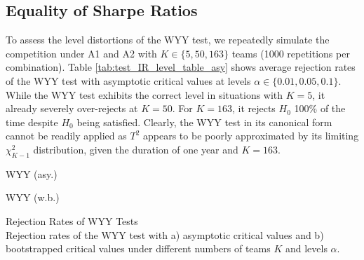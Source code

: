 \documentclass[3p,times,twocolumn]{elsarticle}
\begin{document}
\subsection{Equality of Sharpe Ratios}\label{subsection:equality_IR}

To assess the level distortions of the WYY test, we repeatedly simulate the competition under A1 and A2 with $K \in \{5,50,163\}$ teams (1000 repetitions per combination).
Table \ref{tab:test_IR_level_table_asy} shows average rejection rates of the WYY test with asymptotic critical values at levels $\alpha \in \{0.01,0.05,0.1\}$.
While the WYY test exhibits the correct level in situations with $K=5$, it already severely over-rejects at $K=50$.
For $K=163$, it rejects $H_{0}$ 100\% of the time despite $H_{0}$ being satisfied. 
Clearly, the WYY test in its canonical form cannot be readily applied as $T^{2}$ appears to be poorly approximated by its limiting $\chi^{2}_{K-1}$ distribution, given the duration of one year and $K=163$.

\begin{table}[!htbp]
    \centering
    \label{tab:combined_rejection_rates}
    \fontsize{5}{5}\selectfont 
    \begin{subtable}{.5\linewidth} 
        \centering
        \caption{WYY (asy.)}
        \label{tab:test_IR_level_table_asy}
    \end{subtable}%
    \begin{subtable}{.5\linewidth}
        \centering
        \caption{WYY (w.b.)}
        \label{tab:test_IR_level_table_wb}
    \end{subtable}
    \caption{Rejection Rates of WYY Tests\\
    Rejection rates of the WYY test with a) asymptotic critical values and b) bootstrapped critical values under different numbers of teams $K$ and levels $\alpha$.
    }
\end{table}
\end{document}
